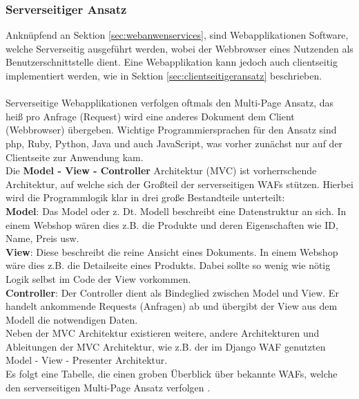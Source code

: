 \subsubsection{Serverseitiger Ansatz}\label{sec:serverseitgeransatz}
Anknüpfend an Sektion \ref{sec:webanwenservices}, sind Webapplikationen Software, welche Serverseitig ausgeführt werden, wobei der Webbrowser eines Nutzenden als Benutzerschnittstelle dient. Eine Webapplikation kann jedoch auch clientseitig implementiert werden, wie in Sektion \ref{sec:clientseitigeransatz} beschrieben. \\ \\
Serverseitige Webapplikationen verfolgen oftmals den Multi-Page Ansatz, das heiß pro Anfrage (Request) wird eine anderes Dokument dem Client (Webbrowser) übergeben. Wichtige Programmiersprachen für den Ansatz sind php, Ruby, Python, Java und auch JavaScript, was vorher zunächst nur auf der Clientseite zur Anwendung kam. \\
Die \textbf{Model - View - Controller} Architektur (MVC) ist vorherrschende Architektur, auf welche sich der Großteil der serverseitigen WAFs stützen.
Hierbei wird die Programmlogik klar in drei große Bestandteile unterteilt: \\
\textbf{Model}: Das Model oder z. Dt. Modell beschreibt eine Datenstruktur an sich. In einem Webshop wären dies z.B. die Produkte und deren Eigenschaften wie ID, Name, Preis usw. \\
\textbf{View}: Diese beschreibt die reine Ansicht eines Dokuments. In einem Webshop wäre dies z.B. die Detailseite eines Produkts. Dabei sollte so wenig wie nötig Logik selbst im Code der View vorkommen. \\
\textbf{Controller}: Der Controller dient als Bindeglied zwischen Model und View. Er handelt ankommende Requests (Anfragen) ab und übergibt der View aus dem Modell die notwendigen Daten. \\ 
Neben der MVC Architektur existieren weitere, andere Architekturen und Ableitungen der MVC Architektur, wie z.B. der im Django WAF genutzten Model - View - Presenter Architektur. \\
Es folgt eine Tabelle, die einen groben Überblick über bekannte WAFs, welche den serverseitigen Multi-Page Ansatz verfolgen \cite{TopWebDe0:online}. 

